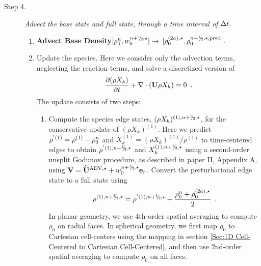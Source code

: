 \begin{description}
\begin{enumerate}
\end{enumerate}

\item[Step 4.] {\em Advect the base state and full state, through a time interval of $\Delta t.$}

\begin{enumerate}
\renewcommand{\theenumi}{{\bf \alph{enumi}}}

\item {\bf Advect Base Density}$[\rhozero^{n},w_0^{\nph,\star}] \rightarrow$ 
$[\rho_0^{(2a),\star}, \rho_0^{\nph,\star,{\rm pred}}]$.

\item \label{step:species update} 
Update the species.  Here we consider only the advection terms, 
neglecting the reaction terms, and solve a discretized version of
\begin{equation}
\frac{\partial (\rho X_k)}{\partial t} + \nabla \cdot ({\bf U} \rho X_k) = 0 \enskip .
\label{eq:species}
\end{equation}
The update consists of two steps:

  \begin{enumerate}
  \renewcommand{\labelenumii}{{\bf \roman{enumii}}.}

  \item Compute the species edge states, $(\rho X_k)^{(1),\nph,\star}$,
  for the conservative update of $(\rho X_k)^{(1)}$. 
  Here we predict $\rho^{'(1)} = \rho^{(1)} - \rho_0^n$ and 
  $X_k^{(1)} = (\rho X_k)^{(1)} / \rho^{(1)}$ to time-centered edges to obtain 
  $\rho^{'(1),\nph,\star}$ and $X_k^{(1),\nph,\star}$ using a second-order
  unsplit Godunov procedure, as described in paper II,
  Appendix A, using $\Vb = \uadvone+w_0^{\nph,\star} \eb_r$.  Convert the 
  perturbational edge state to a full state using
\begin{equation}
\rho^{(1),\nph,\star} = 
\rho^{'(1),\nph,\star} + \frac{\rho_0^n + \rho_0^{(2a),\star}}{2} \enskip .
\label{eq:rhoXedgestate}
\end{equation}
  In planar geometry, we use 4th-order spatial averaging to compute $\rho_0$ on 
  radial faces.  In spherical geometry, we first map $\rho_0$ to Cartesian cell-centers 
  using the mapping in section \ref{Sec:1D Cell-Centered to Cartesian Cell-Centered}, 
  and then use 2nd-order spatial averaging to compute $\rho_0$ on all faces.


\end{enumerate}
\end{enumerate}
\end{description}
